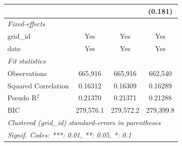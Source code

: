 \begin{tabular}{lccc}
                                                                                               &                &                       & (0.181)\\   
   \midrule
   \emph{Fixed-effects}\\
   grid\_id                                                                                    & Yes            & Yes                   & Yes\\  
   date                                                                                        & Yes            & Yes                   & Yes\\  
   \midrule
   \emph{Fit statistics}\\
   Observations                                                                                & 665,916        & 665,916               & 662,540\\  
   Squared Correlation                                                                         & 0.16312        & 0.16309               & 0.16289\\  
   Pseudo R$^2$                                                                                & 0.21370        & 0.21371               & 0.21288\\  
   BIC                                                                                         & 279,576.1      & 279,572.2             & 279,399.8\\  
   \midrule \midrule
   \multicolumn{4}{l}{\emph{Clustered (grid\_id) standard-errors in parentheses}}\\
   \multicolumn{4}{l}{\emph{Signif. Codes: ***: 0.01, **: 0.05, *: 0.1}}\\
\end{tabular}
\par\endgroup


